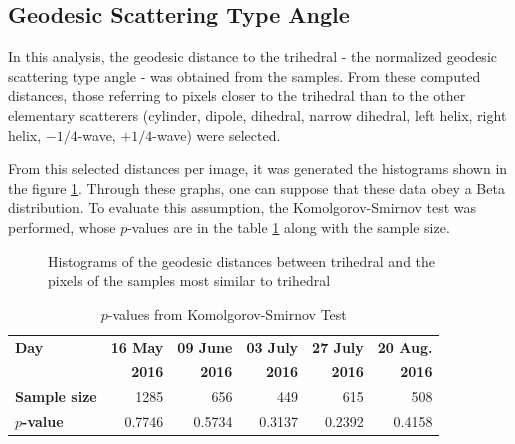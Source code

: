 \documentclass[12pt]{article}
\begin{document}
\subsection{Geodesic Scattering Type Angle}

In this analysis, the geodesic distance to the trihedral - the normalized geodesic scattering type angle - was obtained from the samples. From these computed distances, those referring to pixels closer to the trihedral than to the other elementary scatterers (cylinder, dipole, dihedral, narrow dihedral, left helix, right helix, $-1/4$-wave, $+1/4$-wave) were selected.

From this selected distances per image, it was generated the histograms shown in the figure \ref{fig:histograms_alpha}. Through these graphs, one can suppose that these data obey a Beta distribution. To evaluate this assumption, the Komolgorov-Smirnov test was performed, whose $p$-values are in the table \ref{tab:pvalues_alpha} along with the sample size.

\begin{figure}[hbt]
\centering
{}
\caption{Histograms of the geodesic distances between trihedral and the pixels of the samples most similar to trihedral}
\label{fig:histograms_alpha}
\end{figure}

\begin{table}[hbt]
  \centering
  \caption{$p$-values from Komolgorov-Smirnov Test}
  \label{tab:pvalues_alpha}
  \begin{tabular}{lrrrrr}
    \toprule
    \textbf{Day} & \textbf{16 May} & \textbf{09 June} & \textbf{03 July} & \textbf{27 July} & \textbf{20 Aug.}\\ 
                 & \textbf{2016} & \textbf{2016} & \textbf{2016} & \textbf{2016} & \textbf{2016}\\\midrule
    \textbf{Sample size} & 1285 & 656 & 449 & 615 & 508\\
    \textbf{$p$-value} & 0.7746 & 0.5734 & 0.3137 & 0.2392 & 0.4158\\
    \bottomrule
  \end{tabular}
\end{table}
\end{document}
